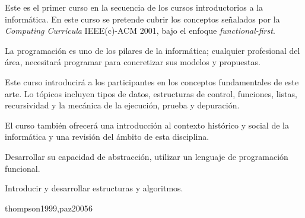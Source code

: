 \begin{syllabus}


\begin{justification}
Este es el primer curso en la secuencia de los cursos introductorios a la informática. En este curso se pretende cubrir los conceptos señalados por la \textit{Computing Curricula} IEEE(c)-ACM 2001, bajo el enfoque \textit{functional-first}.

La programación es uno de los pilares de la informática; cualquier profesional del área, necesitará programar para concretizar sus modelos y propuestas.

Este curso introducirá a los participantes en los conceptos fundamentales de este arte. Lo tópicos incluyen tipos de datos, estructuras de control, funciones, listas, recursividad y la mecánica de la ejecución, prueba y depuración. 

El curso también ofrecerá una introducción al contexto histórico y social de la informática y una revisión del ámbito de esta disciplina.
\end{justification}

\begin{goals}
\item Desarrollar su capacidad de abstracción, utilizar un lenguaje de programación funcional.
\item Introducir y desarrollar estructuras y algoritmos.
\end{goals}

\begin{outcomes}
\end{outcomes}

\begin{unit}{\SPONEDef}{thompson1999,paz2005}{6}
   \begin{topics}
      \item \SPONETopicHistoria
      \item \SPONETopicPioneros
   \end{topics}

   \begin{unitgoals}
      \item \SPONEObjONE
      \item \SPONEObjTWO
      \item \SPONEObjTHREE
   \end{unitgoals}
\end{unit}


\end{syllabus}
